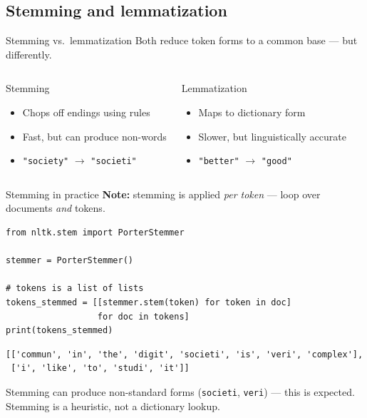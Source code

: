 \documentclass[handout]{beamer}
\begin{document}
\subsection{Stemming and lemmatization}

\begin{frame}{Stemming vs.\ lemmatization}
Both reduce token forms to a common base --- but differently.

\vspace{0.5em}
\begin{columns}
\begin{block}{Stemming}
\begin{itemize}
    \item Chops off endings using rules
    \item Fast, but can produce non-words
    \item \texttt{"society"} $\to$ \texttt{"societi"}
\end{itemize}
\end{block}
\begin{block}{Lemmatization}
\begin{itemize}
    \item Maps to dictionary form
    \item Slower, but linguistically accurate
    \item \texttt{"better"} $\to$ \texttt{"good"}
\end{itemize}
\end{block}
\end{columns}
\end{frame}

\begin{frame}[fragile]{Stemming in practice}
\textbf{Note:} stemming is applied \emph{per token} --- loop over documents \emph{and} tokens.

\begin{verbatim}
from nltk.stem import PorterStemmer

stemmer = PorterStemmer()

# tokens is a list of lists
tokens_stemmed = [[stemmer.stem(token) for token in doc]
                  for doc in tokens]
print(tokens_stemmed)
\end{verbatim}

\pause

\begin{verbatim}
[['commun', 'in', 'the', 'digit', 'societi', 'is', 'veri', 'complex'],
 ['i', 'like', 'to', 'studi', 'it']]
\end{verbatim}

\pause
\small Stemming can produce non-standard forms (\texttt{societi}, \texttt{veri}) --- this is expected. Stemming is a heuristic, not a dictionary lookup.
\end{frame}
\end{document}
